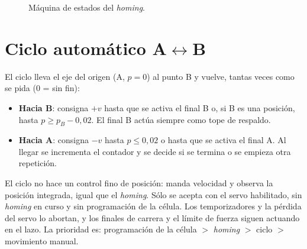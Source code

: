 \begin{figure}[H]
\centering
{}
\caption{Máquina de estados del \emph{homing}.}
\label{fig:homing}
\end{figure}

\section{Ciclo automático A$\leftrightarrow$B}

El ciclo lleva el eje del origen (A, $p=0$) al punto B y vuelve, tantas veces como se pida (0 = sin fin):
\begin{itemize}
  \item \textbf{Hacia B}: consigna $+v$ hasta que se activa el final B o, si B es una posición, hasta
        $p \ge p_B - 0{,}02$. El final B actúa siempre como tope de respaldo.
  \item \textbf{Hacia A}: consigna $-v$ hasta $p \le 0{,}02$ o hasta que se activa el final A. Al llegar
        se incrementa el contador y se decide si se termina o se empieza otra repetición.
\end{itemize}
El ciclo no hace un control fino de posición: manda velocidad y observa la posición integrada, igual
que el \emph{homing}. Sólo se acepta con el servo habilitado, sin \emph{homing} en curso y sin
programación de la célula. Los temporizadores y la pérdida del servo lo abortan, y los finales de
carrera y el límite de fuerza siguen actuando en el lazo. La prioridad es: programación de la célula
$>$ \emph{homing} $>$ ciclo $>$ movimiento manual.


